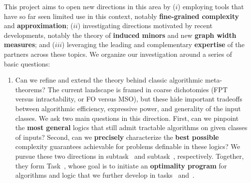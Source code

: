 \documentclass[a4paper,11pt]{article}
\newcommand{\fo}{\textsf{FO}\xspace}
\newcommand{\mso}{\textsf{MSO}\xspace}
\newcommand{\giannos}[1]{\noindent{\bf {\color{violet}{\sc Giannos:}  #1}}}
\begin{document}
This project aims to open new directions in this area by ($i$) employing tools that have so far seen limited use in this context, notably \textbf{fine-grained complexity} and \textbf{approximation}; ($ii$) investigating directions motivated by recent developments, notably the theory of \textbf{induced minors} and new \textbf{graph width measures}; and ($iii$) leveraging the leading and complementary \textbf{expertise} of the partners across these topics.
We organize our investigation around a series of basic questions:

\begin{enumerate}

\item Can we refine and extend the theory behind classic algorithmic meta-theorems?
The current landscape is framed in coarse dichotomies (FPT versus intractability, or \fo versus \mso), but these hide important tradeoffs between algorithmic efficiency, expressive power, and generality of the input classes.
We ask two main questions in this direction.
First, can we pinpoint the \textbf{most general} logics that still admit tractable algorithms on given classes of inputs?
Second, can we \textbf{precisely} characterize the \textbf{best possible} complexity guarantees achievable for problems definable in these logics?
We pursue these two directions in subtask~ and subtask~, respectively.
Together, they form Task~, whose goal is to initiate an \textbf{optimality program} for algorithms and logic that we further develop in tasks~ and~.



\end{enumerate}
\end{document}
